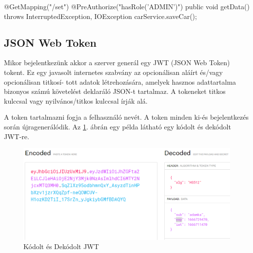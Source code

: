 \begin{java}
@GetMapping("/set")
@PreAuthorize("hasRole('ADMIN')")
public void getData() throws InterruptedException,
IOException {
   carService.saveCar();
}
\end{java}
\newpage

\subsection{JSON Web Token}
Mikor bejelentkezünk akkor a szerver generál egy JWT (JSON Web Token)\cite{JWTexample} tokent. Ez egy javasolt internetes szabvány az opcionálisan aláírt és/vagy opcionálisan titkosí-
tott adatok létrehozására, amelyek hasznos adattartalma bizonyos számú követelést deklaráló JSON-t tartalmaz. A tokeneket titkos kulccsal vagy nyilvános/titkos kulccsal írják alá.

A token tartalmazni fogja a felhasználó nevét. A token minden ki-és bejelentkezés során újragenerálódik. 
Az \ref{fig:JWT}. ábrán egy példa látható egy kódolt és dekódolt JWT-re.

\begin{figure}[h]
\centering
\includegraphics[scale=0.6]{images/jwt.io.png}
\caption{Kódolt és Dekódolt JWT \cite{JWTexample}}
\label{fig:JWT}
\end{figure}